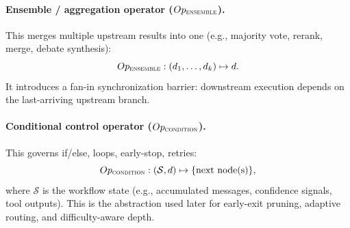 \paragraph{Ensemble / aggregation operator ($Op_{\textsc{ensemble}}$).}
This merges multiple upstream results into one (e.g., majority vote, rerank, merge, debate synthesis):
\[
Op_{\textsc{ensemble}}: (d_1,\ldots,d_k) \mapsto d.
\]
It introduces a fan-in synchronization barrier: downstream execution depends on the last-arriving upstream branch.

\paragraph{Conditional control operator ($Op_{\textsc{condition}}$).}
This governs if/else, loops, early-stop, retries:
\[
Op_{\textsc{condition}}: (\mathcal{S}, d) \mapsto \{\text{next node(s)}\},
\]
where $\mathcal{S}$ is the workflow state (e.g., accumulated messages, confidence signals, tool outputs).
This is the abstraction used later for early-exit pruning, adaptive routing, and difficulty-aware depth.


